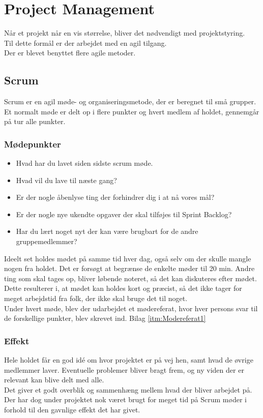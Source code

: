 \newpage
\section{Project Management}

Når et projekt når en vis størrelse, bliver det nødvendigt med projektstyring.\\
Til dette formål er der arbejdet med en agil tilgang.\\

Der er blevet benyttet flere agile metoder.

\subsection{Scrum}

Scrum er en agil møde- og organiseringsmetode, der er beregnet til små grupper. Et normalt møde er delt op i flere punkter og hvert medlem af holdet, gennemgår på tur alle punkter.

\subsubsection{Mødepunkter}
\begin{itemize}[noitemsep]
	\item Hvad har du lavet siden sidste scrum møde.
	\item Hvad vil du lave til næste gang?
	\item Er der nogle åbenlyse ting der forhindrer dig i at nå vores mål?
	\item Er der nogle nye ukendte opgaver der skal tilføjes til Sprint Backlog?
	\item Har du lært noget nyt der kan være brugbart for de andre gruppemedlemmer?
\end{itemize}

Ideelt set holdes mødet på samme tid hver dag, også selv om der skulle mangle nogen fra holdet.
Det er forsøgt at begrænse de enkelte møder til 20 min. Andre ting som skal tages op, bliver løbende noteret, så det kan diskuteres efter mødet. Dette resulterer i, at mødet kan holdes kort og præcist, så det ikke tager for meget arbejdstid fra folk, der ikke skal bruge det til noget.\\

Under hvert møde, blev der udarbejdet et mødereferat, hvor hver persons svar til de forskellige punkter, blev skrevet ind. Bilag \ref{itm:Modereferat1}


\subsubsection{Effekt}
Hele holdet får en god idé om hvor projektet er på vej hen, samt hvad de øvrige medlemmer laver.
Eventuelle problemer bliver bragt frem, og ny viden der er relevant kan blive delt med alle.\\
Det giver et godt overblik og sammenhæng mellem hvad der bliver arbejdet på. Der har dog under projektet nok været brugt for meget tid på Scrum møder i forhold til den gavnlige effekt det har givet.


